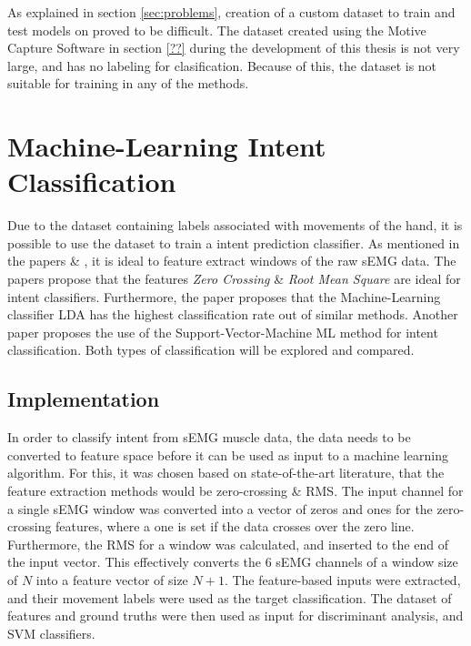 \documentclass[../main.tex]{subfiles}
\begin{document}
As explained in section \ref{sec:problems}, creation of a custom dataset to train and test models on proved to be difficult.
The dataset created using the Motive Capture Software in section \ref{??} during the development of this thesis is not very large, and has no labeling for clasification.
Because of this, the dataset is not suitable for training in any of the methods.


\section{Machine-Learning Intent Classification}

Due to the dataset containing labels associated with movements of the hand, it is possible to use the dataset to train a intent prediction classifier.
As mentioned in the papers \cite{??} \& \cite{??}, it is ideal to feature extract windows of the raw sEMG data.
The papers propose that the features \textit{Zero Crossing} \& \textit{Root Mean Square} are ideal for intent classifiers.
Furthermore, the paper \cite{??} proposes that the Machine-Learning classifier LDA has the highest classification rate out of similar methods.
Another paper \cite{??} proposes the use of the Support-Vector-Machine ML method for intent  classification.
Both types of classification will be explored and compared.

\subsection{Implementation}

In order to classify intent from sEMG muscle data, the data needs to be converted to feature space before it can be used as input to a machine learning algorithm.
For this, it was chosen based on state-of-the-art literature, that the feature extraction methods would be zero-crossing \& RMS.
The input channel for a single sEMG window was converted into a vector of zeros and ones for the zero-crossing features, where a one is set if the data crosses over the zero line.
Furthermore, the RMS for a window was calculated, and inserted to the end of the input vector. This effectively converts the 6 sEMG channels of a window size of $N$ into a feature vector of size $N+1$.
The feature-based inputs were extracted, and their movement labels were used as the target classification.
The dataset of features and ground truths were then used as input for discriminant analysis, and SVM classifiers.
\end{document}
